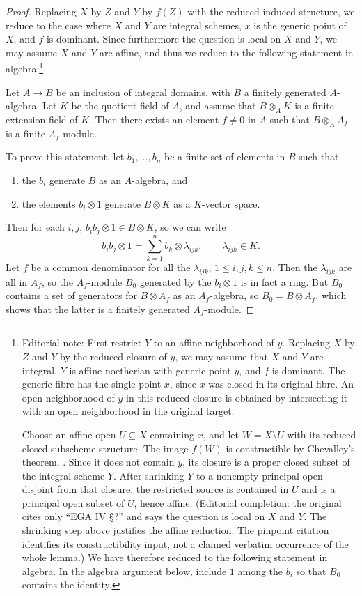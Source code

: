 \begin{proof}
Replacing $X$ by $Z$ and $Y$ by $\overline{f(Z)}$ with the reduced induced structure, we reduce to the case where $X$ and $Y$ are integral schemes, $x$ is the generic point of $X$, and $f$ is dominant. Since furthermore the question is local on $X$ and $Y$, we may assume $X$ and $Y$ are affine, and thus we reduce to the following statement in algebra:\footnote{Editorial note: First restrict $Y$ to an affine neighborhood of $y$. Replacing $X$ by $Z$ and $Y$ by the reduced closure of $y$, we may assume that $X$ and $Y$ are integral, $Y$ is affine noetherian with generic point $y$, and $f$ is dominant. The generic fibre has the single point $x$, since $x$ was closed in its original fibre. An open neighborhood of $y$ in this reduced closure is obtained by intersecting it with an open neighborhood in the original target.\par
Choose an affine open $U\subseteq X$ containing $x$, and let $W=X\setminus U$ with its reduced closed subscheme structure. The image $f(W)$ is constructible by Chevalley's theorem, \cite[\nopp IV,~1.8.5]{EGA}. Since it does not contain $y$, its closure is a proper closed subset of the integral scheme $Y$. After shrinking $Y$ to a nonempty principal open disjoint from that closure, the restricted source is contained in $U$ and is a principal open subset of $U$, hence affine. (Editorial completion: the original cites only ``EGA IV \S?'' and says the question is local on $X$ and $Y$. The shrinking step above justifies the affine reduction. The pinpoint citation identifies its constructibility input, not a claimed verbatim occurrence of the whole lemma.) We have therefore reduced to the following statement in algebra. In the algebra argument below, include $1$ among the $b_i$ so that $B_0$ contains the identity.}

Let $A\to B$ be an inclusion of integral domains, with $B$ a finitely generated $A$-algebra. Let $K$ be the quotient field of $A$, and assume that $B\otimes_A K$ is a finite extension field of $K$. Then there exists an element $f\neq0$ in $A$ such that $B\otimes_A A_f$ is a finite $A_f$-module.

To prove this statement, let $b_1,\dots,b_n$ be a finite set of elements in $B$ such that
\begin{enumerate}
\item[1)] the $b_i$ generate $B$ as an $A$-algebra, and
\item[2)] the elements $b_i\otimes 1$ generate $B\otimes K$ as a $K$-vector space.
\end{enumerate}
Then for each $i,j$, $b_i b_j\otimes 1 \in B\otimes K$, so we can write
\[
b_i b_j \otimes 1 = \sum_{k=1}^{n} b_k \otimes \lambda_{ijk},\qquad \lambda_{ijk}\in K.
\]
Let $f$ be a common denominator for all the $\lambda_{ijk}$, $1\leq i,j,k\leq n$. Then the $\lambda_{ijk}$ are all in $A_f$, so the $A_f$-module $B_0$ generated by the $b_i\otimes 1$ is in fact a ring. But $B_0$ contains a set of generators for $B\otimes A_f$ as an $A_f$-algebra, so $B_0 = B\otimes A_f$, which shows that the latter is a finitely generated $A_f$-module.
\end{proof}

